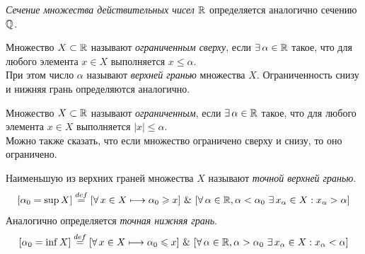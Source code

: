 \begin{definition}
\textit{Сечение множества действительных чисел \(\mathbb{R}\)} определяется
аналогично сечению \(\mathbb{Q}\).
\end{definition}

\begin{definition}
Множество \(X\subset\mathbb{R}\) называют \textit{ограниченным сверху},
если \(\exists\,\alpha\in\mathbb{R}\) такое, что для любого элемента \(x\in X\)
выполняется \(x\leq\alpha\). \\
При этом число \(\alpha\) называют \textit{верхней гранью} множества \(X\).
Ограниченность снизу и нижняя грань определяются аналогично.

\vspace{2mm}

Множество \(X\subset\mathbb{R}\) называют \textit{ограниченным},
если \(\exists\,\alpha\in\mathbb{R}\) такое, что для любого элемента \(x\in X\)
выполняется \(|x|\leq\alpha\). \\
Можно также сказать, что если множество ограничено сверху и снизу, то оно ограничено.
\end{definition}

\begin{definition}
Наименьшую из верхних граней множества \(X\) называют \textit{точной верхней гранью}.
\[
    [\alpha_{0} = \sup X] \overset{def}{=} [\forall \, x \in X \longmapsto \alpha_{0} \geqslant x]
    ~ \& ~ [\forall \, \alpha \in \mathbb{R}, \alpha < \alpha_{0} ~\exists \, x_{\alpha} \in X :
    x_{\alpha} > \alpha]
\]
Аналогично определяется \textit{точная нижняя грань}.
\[
    [\alpha_{0} = \inf X] \overset{def}{=} [\forall \, x \in X \longmapsto \alpha_{0} \leqslant x]
    ~ \& ~[\forall \, \alpha \in \mathbb{R}, \alpha > \alpha_{0} ~ \exists \, x_{\alpha} \in X :
    x_{\alpha} < \alpha]
\]
\end{definition}

